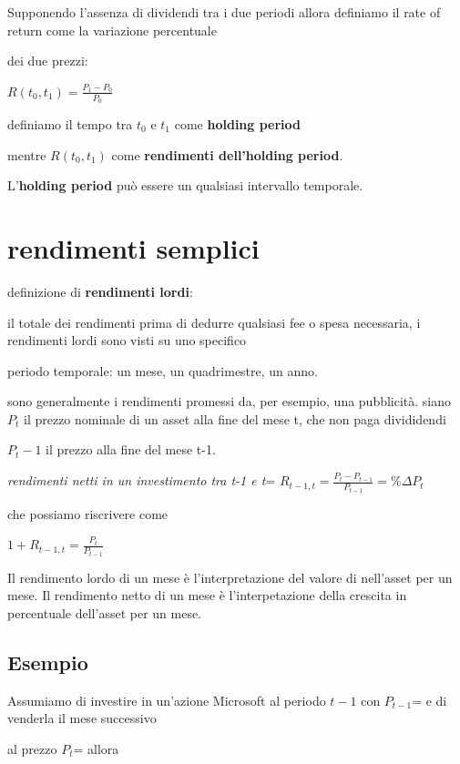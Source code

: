 \documentclass[a4paper,11pt]{report}
\begin{document}
{	Supponendo l'assenza di dividendi tra i due periodi allora definiamo il rate of return come la variazione percentuale

	dei due prezzi:
\begin{center}
	$R(t_0,t_1)={\frac {P_1-P_0}{P_0}}$
\end{center}
	definiamo il tempo tra $t_0$ e $t_1$ come \textbf{holding period}  

	mentre $R(t_0,t_1)$ come \textbf{rendimenti dell'holding period}.

	L'\textbf{holding period} può essere un qualsiasi intervallo temporale.

\section{rendimenti semplici}
	definizione di \textbf{rendimenti lordi}:

	il totale dei rendimenti prima di dedurre qualsiasi fee o spesa necessaria, i rendimenti lordi sono visti su uno specifico

	periodo temporale: un mese, un quadrimestre, un anno. 

	sono generalmente i rendimenti promessi da, per esempio, una pubblicità. \newline
 	siano $P_t$ il prezzo nominale di un asset alla fine del mese t, che non paga divididendi

	$P_t-1$ il prezzo alla fine del mese t-1. \newline

\begin{center}
	{\emph{rendimenti netti in un investimento tra t-1 e t}}= $R_{t-1,t}={\frac {P_t - P_{t-1}}{P_{t-1}}}= \%\Delta P_t$
\end{center}	
	che possiamo riscrivere come
\begin{center}
 	$1+R_{t-1,t}={\frac {P_t}{P_{t-1}}}$
\end{center}
	Il rendimento lordo di un mese è l'interpretazione del valore di {} nell'asset per un mese.
	Il rendimento netto di un mese è l'interpetazione della crescita in percentuale dell'asset per un mese.
\subsection{Esempio}
	Assumiamo di investire in un'azione Microsoft al periodo $t-1$ con $P_{t-1}$={} e di venderla il mese successivo

	al prezzo $P_t$={} allora
	
}
\end{document}
